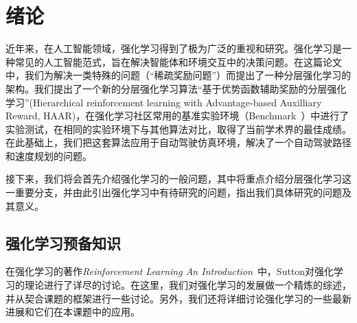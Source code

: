 \chapter{绪论}
近年来，在人工智能领域，强化学习得到了极为广泛的重视和研究。强化学习是一种常见的人工智能范式，旨在解决智能体和环境交互中的决策问题。在这篇论文中，我们为解决一类特殊的问题（``稀疏奖励问题''）而提出了一种分层强化学习的架构。我们提出了一个新的分层强化学习算法``基于优势函数辅助奖励的分层强化学习''(Hierarchical reinforcement learning with Advantage-based Auxilliary Reward, HAAR)，在强化学习社区常用的基准实验环境（Benchmark~\cite{benchmarking_RL}）中进行了实验测试，在相同的实验环境下与其他算法对比，取得了当前学术界的最佳成绩。在此基础上，我们把这套算法应用于自动驾驶仿真环境，解决了一个自动驾驶路径和速度规划的问题。

接下来，我们将会首先介绍强化学习的一般问题，其中将重点介绍分层强化学习这一重要分支，并由此引出强化学习中有待研究的问题，指出我们具体研究的问题及其意义。

\section{强化学习预备知识}
  在强化学习的著作\textit{Reinforcement Learning An Introduction}~\cite{Sutton_book}中，Sutton对强化学习的理论进行了详尽的讨论。在这里，我们对强化学习的发展做一个精炼的综述，并从契合课题的框架进行一些讨论。另外，我们还将详细讨论强化学习的一些最新进展和它们在本课题中的应用。
